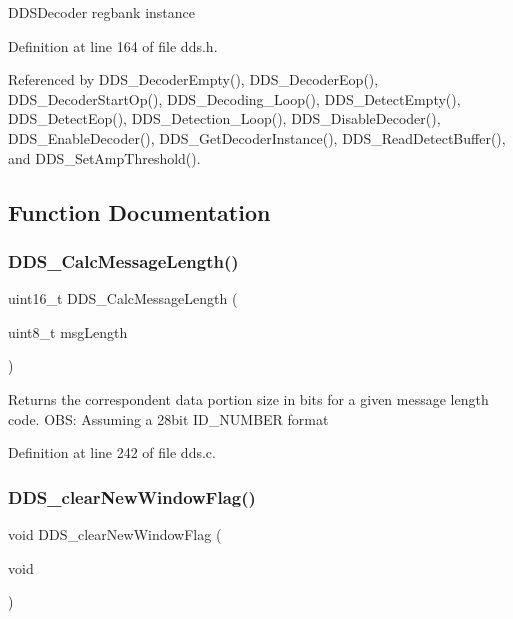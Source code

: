 D\+D\+S\+Decoder regbank instance 

Definition at line 164 of file dds.\+h.



Referenced by D\+D\+S\+\_\+\+Decoder\+Empty(), D\+D\+S\+\_\+\+Decoder\+Eop(), D\+D\+S\+\_\+\+Decoder\+Start\+Op(), D\+D\+S\+\_\+\+Decoding\+\_\+\+Loop(), D\+D\+S\+\_\+\+Detect\+Empty(), D\+D\+S\+\_\+\+Detect\+Eop(), D\+D\+S\+\_\+\+Detection\+\_\+\+Loop(), D\+D\+S\+\_\+\+Disable\+Decoder(), D\+D\+S\+\_\+\+Enable\+Decoder(), D\+D\+S\+\_\+\+Get\+Decoder\+Instance(), D\+D\+S\+\_\+\+Read\+Detect\+Buffer(), and D\+D\+S\+\_\+\+Set\+Amp\+Threshold().



\subsection{Function Documentation}
\mbox{\label{group___d_d_s_ga3c1b6aafe67b4074170688cf170fad65}} 
\subsubsection{\texorpdfstring{D\+D\+S\+\_\+\+Calc\+Message\+Length()}{DDS\_CalcMessageLength()}}
{\footnotesize\ttfamily uint16\+\_\+t D\+D\+S\+\_\+\+Calc\+Message\+Length (\begin{DoxyParamCaption}\item[{uint8\+\_\+t}]{msg\+Length }\end{DoxyParamCaption})}

Returns the correspondent data portion size in bits for a given message length code. O\+BS\+: Assuming a 28bit I\+D\+\_\+\+N\+U\+M\+B\+ER format 

Definition at line 242 of file dds.\+c.

\mbox{\label{group___d_d_s_ga27670bb6491dd40f4c605dbec0bf505d}} 
\subsubsection{\texorpdfstring{D\+D\+S\+\_\+clear\+New\+Window\+Flag()}{DDS\_clearNewWindowFlag()}}
{\footnotesize\ttfamily void D\+D\+S\+\_\+clear\+New\+Window\+Flag (\begin{DoxyParamCaption}\item[{void}]{ }\end{DoxyParamCaption})}

